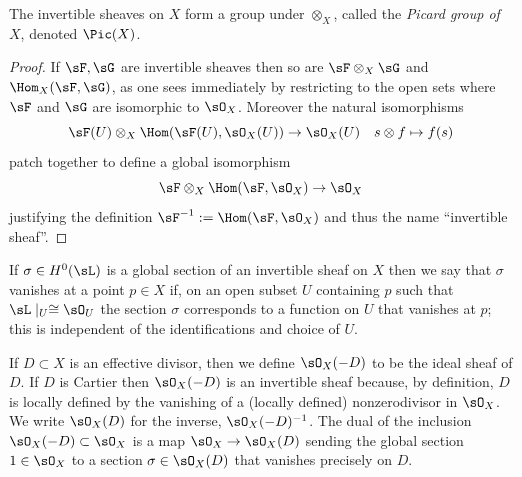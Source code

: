 \begin{proposition}
 The invertible sheaves on $X$ form a group under $\otimes_{X}$, called the 
\emph{Picard group of $X$}, denoted $\Pic(X)$. 
\end{proposition}
\begin{proof}
 If $\sF, \sG$ are invertible sheaves then so are $\sF\otimes_{X}\sG$ and  $\Hom_{X}(\sF, \sG)$, as one sees immediately by
restricting to the open sets where $\sF$ and $\sG$ are isomorphic to $\sO_{X}$. Moreover the natural isomorphisms
$$
\sF(U) \otimes_{X} \Hom(\sF(U), \sO_{X}(U)) \to \sO_{X}(U)\quad s \otimes f \mapsto f(s)
$$ 
patch together to define a global isomorphism 
$$
\sF \otimes_{X} \Hom(\sF, \sO_{X}) \to \sO_{X}
$$
justifying the definition
$\sF^{-1} := \Hom(\sF, \sO_{X})$ and thus the name ``invertible sheaf''. 
\end{proof}
 
 If $\sigma\in H^{0}(\sL)$ is a global section of an invertible sheaf on $X$ then we say that $\sigma$ vanishes at a point $p\in X$ if, on an  open subset $U$ containing $p$ such that $\sL\mid_{U} \cong \sO_{U}$ the section
$\sigma$ corresponds to a function on $U$ that vanishes at $p$; this is independent of the identifications and choice of $U$. 

If $D\subset X$ is an effective divisor, then we define $\sO_{X}(-D)$ to be the ideal sheaf of $D$. If $D$ is Cartier then
$\sO_{X}(-D)$ is an invertible
sheaf because, by definition, $D$ is locally defined by the vanishing of a (locally defined) nonzerodivisor in $\sO_{X}$.
We write $\sO_{X}(D)$ for the inverse, $\sO_{X}(-D)^{-1}$. The dual of the inclusion
$\sO_{X}(-D)\subset \sO_{X}$ is a map $\sO_{X} \to \sO_{X}(D)$ sending the global section $1\in \sO_{X}$ to a section
$\sigma\in \sO_{X}(D)$ that vanishes precisely on $D$.

